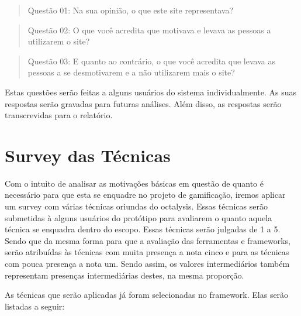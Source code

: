 \begin{quotation}
    Questão 01: Na sua opinião, o que este site representava?
\end{quotation}

\begin{quotation}
    Questão 02: O que você acredita que motivava e levava as pessoas a utilizarem o site?
\end{quotation}

\begin{quotation}
    Questão 03: E quanto ao contrário, o que você acredita que levava as pessoas a se desmotivarem e a não
    utilizarem mais o site?
\end{quotation}

Estas questões serão feitas a alguns usuários do sistema individualmente. As suas respostas serão gravadas para futuras análises.
Além disso, as respostas serão transcrevidas para o relatório.

\section{Survey das Técnicas}
\label{sub:survey_das_t_cnicas}
Com o intuito de analisar as motivações básicas em questão de quanto é necessário para que esta se enquadre no projeto
de gamificação, iremos aplicar um survey com várias técnicas oriundas do octalysis. Essas técnicas serão submetidas à alguns
usuários do protótipo para avaliarem o quanto aquela técnica se enquadra dentro do escopo. Essas técnicas serão julgadas de 1
a 5. Sendo que da mesma forma para que a avaliação das ferramentas e frameworks, serão atribuídas às técnicas com
muita presença a nota cinco e para as técnicas com pouca presença a nota um. Sendo assim, os valores intermediários
também representam presenças intermediárias destes, na mesma proporção.

As técnicas que serão aplicadas já foram selecionadas no framework. Elas serão listadas a seguir:

